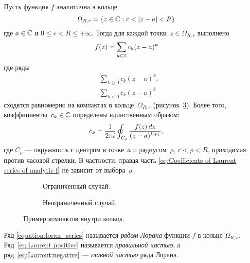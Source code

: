 \documentclass[../complex-analysis.tex]{subfiles}
\begin{document}
\begin{thm}[Лорана]
 \label{theorem:Laurent series of analytic function}
 Пусть функция $ f $ аналитична в кольце
 \begin{align*}
  \Omega_{R,r} = \left\{ z \in \mathbb{C} : r < \left| z - a \right| < R \right\}
 \end{align*} где $ a \in \mathbb{C} $ и $ 0 \leqslant r < R \leqslant +\infty $. Тогда для каждой точки~$ z \in \Omega_{R,r} $ выполнено
 \begin{align}
  \label{equation:loran_series}
  f(z) = \sum_{k \in \mathbb{Z}} c_k(z - a)^{k}
 \end{align} где ряды
 \begin{align}
  \label{eq:Laurent positive}&\sum_{k \geqslant 0} c_k (z-a)^{k},\\
  \label{eq:Laurent:negative}&\sum_{k < 0} c_k (z-a)^{k}
 \end{align} сходятся равномерно на компактах в кольце~$ \Omega_{R,r} $ (рисунок~\ref{fig:laurent-series-compacts}). Более того, коэффициенты~$ c_k \in \mathbb{C} $ определены единственным образом:
 \begin{align}
  \label{eq:Coefficients of Laurent series of analytic f}
  c_k = \frac{1}{2\pi i} \varointctrclockwise_{C_\rho} \frac{f(z)\,dz}{(z-a)^{k+1}},
 \end{align} где $ C_\rho $ --- окружность с центром в точке~$ a $ и радиусом~$ \rho $,  $ r < \rho < R $, проходимая против часовой стрелки. В частности, правая часть \eqref{eq:Coefficients of Laurent series of analytic f} не зависит от выбора~$ \rho $.
\end{thm}

\begin{figure}[ht]
 \begin{subfigure}{0.45\textwidth}
  \centering
  \caption{Ограниченный случай.}
  \label{fig:laurent-series-compacts-limited}
 \end{subfigure}
 \begin{subfigure}{0.45\textwidth}
  \centering
  \caption{Неограниченный случай.}
  \label{fig:laurent-series-compacts-not-limited}
 \end{subfigure}
 \caption{Пример компактов внутри кольца.}
 \label{fig:laurent-series-compacts}
\end{figure}

\begin{df}
 Ряд \eqref{equation:loran_series} называется \textit{рядом Лорана} функции $ f $ в кольце $ \Omega_{R,r} $. Ряд~\eqref{eq:Laurent positive} называется \emph{правильной частью}, а ряд~\eqref{eq:Laurent:negative} --- \emph{главной частью} ряда Лорана.
\end{df}
\end{document}
